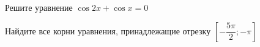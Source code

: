 \begin{ex}
	\begin{condition}
		\begin{enumcols}[label=\asbuk*)]
			\item Решите уравнение \( \cos 2x + \cos x = 0 \)
			\item Найдите все корни уравнения, принадлежащие отрезку \( \left[-\dfrac{5\pi}{2};-\pi\right] \)
		\end{enumcols}
	\end{condition}
\end{ex}